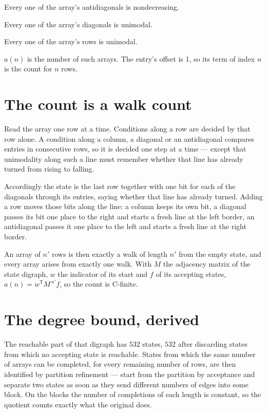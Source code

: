 \documentclass[11pt]{article}
\theoremstyle{definition}
\begin{document}
Every one of the array's antidiagonals is nondecreasing.

Every one of the array's diagonals is unimodal.

Every one of the array's rows is unimodal.

$a(n)$ is the number of such arrays. The entry's offset is 1, so its term of index $n$ is the count for $n$ rows.

\section{The count is a walk count}

Read the array one row at a time. Conditions along a row are decided by that row alone. A condition along a column, a diagonal or an antidiagonal compares entries in consecutive rows, so it is decided one step at a time --- except that unimodality along such a line must remember whether that line has already turned from rising to falling.

Accordingly the state is the last row together with one bit for each of the diagonals through its entries, saying whether that line has already turned. Adding a row moves those bits along the line: a column keeps its own bit, a diagonal passes its bit one place to the right and starts a fresh line at the left border, an antidiagonal passes it one place to the left and starts a fresh line at the right border.

An array of $n'$ rows is then exactly a walk of length $n'$ from the empty state, and every array arises from exactly one walk. With $M$ the adjacency matrix of the state digraph, $w$ the indicator of its start and $f$ of its accepting states, $a(n) = w^{\mathsf T}M^{\,n'}f$, so the count is C-finite.

\section{The degree bound, derived}

The reachable part of that digraph has $532$ states, $532$ after discarding states from which no accepting state is reachable. States from which the same number of arrays can be completed, for every remaining number of rows, are then identified by partition refinement --- start from the partition by acceptance and separate two states as soon as they send different numbers of edges into some block. On the blocks the number of completions of each length is constant, so the quotient counts exactly what the original does.
\end{document}
